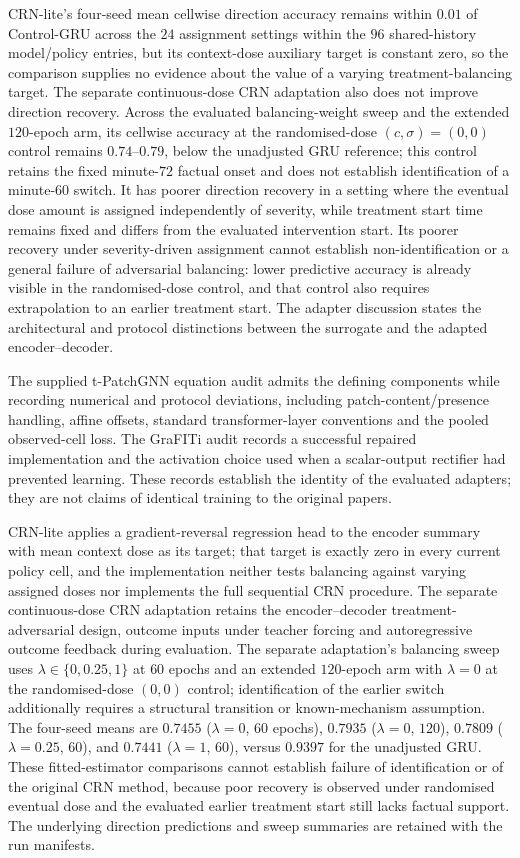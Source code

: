 CRN-lite's four-seed mean cellwise direction accuracy remains within $0.01$ of Control-GRU across the $24$ assignment settings within the $96$ shared-history model/policy entries, but its context-dose auxiliary target is constant zero, so the comparison supplies no evidence about the value of a varying treatment-balancing target. The separate continuous-dose CRN adaptation also does not improve direction recovery. Across the evaluated balancing-weight sweep and the extended $120$-epoch arm, its cellwise accuracy at the randomised-dose $(c,\sigma)=(0,0)$ control remains $0.74$--$0.79$, below the unadjusted GRU reference; this control retains the fixed minute-$72$ factual onset and does not establish identification of a minute-$60$ switch. It has poorer direction recovery in a setting where the eventual dose amount is assigned independently of severity, while treatment start time remains fixed and differs from the evaluated intervention start. Its poorer recovery under severity-driven assignment cannot establish non-identification or a general failure of adversarial balancing: lower predictive accuracy is already visible in the randomised-dose control, and that control also requires extrapolation to an earlier treatment start. The adapter discussion states the architectural and protocol distinctions between the surrogate and the adapted encoder--decoder.

The supplied t-PatchGNN equation audit admits the defining components while recording numerical and protocol deviations, including patch-content/presence handling, affine offsets, standard transformer-layer conventions and the pooled observed-cell loss. The GraFITi audit records a successful repaired implementation and the activation choice used when a scalar-output rectifier had prevented learning. These records establish the identity of the evaluated adapters; they are not claims of identical training to the original papers.

CRN-lite applies a gradient-reversal regression head to the encoder summary with mean context dose as its target; that target is exactly zero in every current policy cell, and the implementation neither tests balancing against varying assigned doses nor implements the full sequential CRN procedure. The separate continuous-dose CRN adaptation retains the encoder--decoder treatment-adversarial design, outcome inputs under teacher forcing and autoregressive outcome feedback during evaluation. The separate adaptation's balancing sweep uses $\lambda\in\{0,0.25,1\}$ at $60$ epochs and an extended $120$-epoch arm with $\lambda=0$ at the randomised-dose $(0,0)$ control; identification of the earlier switch additionally requires a structural transition or known-mechanism assumption. The four-seed means are $0.7455$ ($\lambda=0$, $60$ epochs), $0.7935$ ($\lambda=0$, $120$), $0.7809$ ($\lambda=0.25$, $60$), and $0.7441$ ($\lambda=1$, $60$), versus $0.9397$ for the unadjusted GRU. These fitted-estimator comparisons cannot establish failure of identification or of the original CRN method, because poor recovery is observed under randomised eventual dose and the evaluated earlier treatment start still lacks factual support. The underlying direction predictions and sweep summaries are retained with the run manifests.


